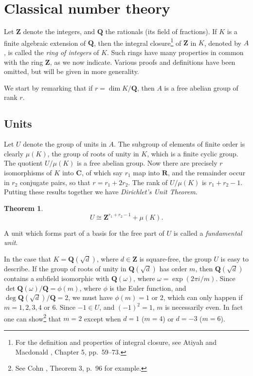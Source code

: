 \documentclass[10pt]{article}
\newtheorem{theo}{Theorem}[subsection]
\theoremstyle{definition}
\def\ZZ{\mathbf{Z}}
\def\QQ{\mathbf{Q}}
\def\RR{\mathbf{R}}
\def\CC{\mathbf{C}}
\def\fnonth{For the definition and properties of integral closure, see Atiyah and Macdonald \cite{bib:17}, Chapter 5, pp.~59--73.}
\def\fnonfo{See Cohn \cite{bib:36}, Theorem 3, p.~96 for example.}
\begin{document}
\section{Classical number theory}
\label{ch:2}

Let $\ZZ$ denote the integers, and $\QQ$ the rationals (its field of fractions).
If $K$ is a finite algebraic extension of $\QQ$, then the integral closure\footnote{\fnonth} of $\ZZ$ in $K$, denoted by $A$, is called the \emph{ring of integers} of $K$.
Such rings have many properties in common with the ring $\ZZ$, as we now indicate.
Various proofs and definitions have been omitted, but will be given in more generality.

We start by remarking that if $r = \dim K/\QQ$, then $A$ is a free abelian group of rank $r$.


\subsection{Units}
\label{ch:2.1}

Let $U$ denote the group of units in $A$.
The subgroup of elements of finite order is clearly $\mu(K)$, the group of roots of unity in $K$, which is a finite cyclic group.
The quotient $U / \mu(K)$ is a free abelian group.
Now there are precisely $r$ isomorphisms of $K$ into $\CC$, of which say $r_1$ map into $\RR$, and the remainder occur in $r_2$ conjugate pairs, so that $r = r_1 + 2 r_2$.
The rank of $U / \mu(K)$ is $r_1 + r_2 - 1$.
Putting these results together we have \emph{Dirichlet's Unit Theorem}.


\begin{theo}
\label{2.1.1}
\[
U \cong \ZZ^{r_1 + r_2 - 1} + \mu(K).
\]
\end{theo}

A unit which forms part of a basis for the free part of $U$ is called a \emph{fundamental unit}.

In the case that $K = \QQ(\sqrt d)$, where $d \in \ZZ$ is square-free, the group $U$ is easy to describe.
If the group of roots of unity in $\QQ(\sqrt d)$ has order $m$, then $\QQ(\sqrt d)$ contains a subfield isomorphic with $\QQ(\omega)$, where $\omega = \exp(2 \pi i / m)$.
Since $\det \QQ(\omega) / \QQ = \phi(m)$, where $\phi$ is the Euler function, and $\deg \QQ(\sqrt d) / \QQ = 2$, we must have $\phi(m) = 1$ or $2$, which can only happen if $m = 1,2,3,4$ or $6$.
Since $-1 \in U$, and $(-1)^2 = 1$, $m$ is necessarily even.
In fact one can show\footnote{\fnonfo} that $m = 2$ except when $d = 1$ ($m = 4$) or $d = -3$ ($m = 6$).
\end{document}
